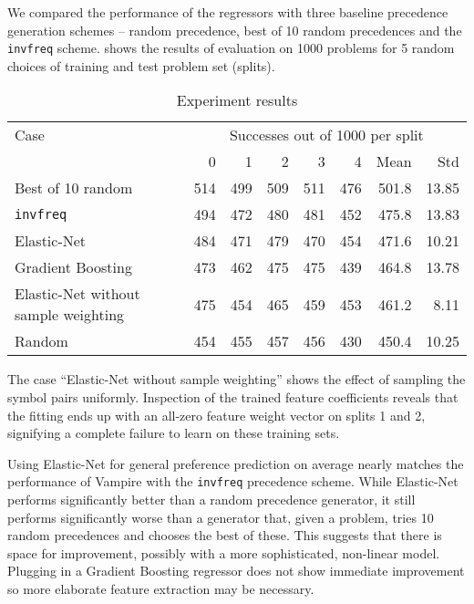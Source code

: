 \documentclass{ceurart}
\begin{document}
We compared the performance of the regressors
with three baseline precedence generation schemes -- random precedence, best of 10 random precedences
and the \texttt{invfreq} scheme.
 shows the results of evaluation on 1000 problems
for 5 random choices of training and test problem set (splits).


\begin{table*}
    \caption{Experiment results}
	\label{table:results}
	\begin{tabular}{l|rrrrr|rr}
	    \toprule
		Case & \multicolumn{7}{c}{Successes out of 1000 per split} \\
		& 0 & 1 & 2 & 3 & 4 & Mean & Std \\
		\midrule
		Best of 10 random & 514 & 499 & 509 & 511 & 476 & 501.8 & 13.85 \\
		\texttt{invfreq} & 494 & 472 & 480 & 481 & 452 & 475.8 & 13.83 \\
		Elastic-Net & 484 & 471 & 479 & 470 & 454 & 471.6 & 10.21 \\
		Gradient Boosting & 473 & 462 & 475 & 475 & 439 & 464.8 & 13.78 \\
		Elastic-Net without sample weighting & 475 & 454 & 465 & 459 & 453 & 461.2 & 8.11 \\
		Random & 454 & 455 & 457 & 456 & 430 & 450.4 & 10.25 \\
		\bottomrule
	\end{tabular}
\end{table*}

The case ``Elastic-Net without sample weighting'' shows the effect of
sampling the symbol pairs uniformly.
Inspection of the trained feature coefficients reveals that the fitting ends up
with an all-zero feature weight vector on splits 1 and 2,
signifying a complete failure to learn on these training sets.

Using Elastic-Net for general preference prediction on average nearly matches the performance
of Vampire with the \texttt{invfreq} precedence scheme.
While Elastic-Net performs significantly better than a random precedence generator,
it still performs significantly worse than a generator
that, given a problem, tries 10 random precedences and chooses the best of these.
This suggests that there is space for improvement, possibly with a more sophisticated, non-linear model.
Plugging in a Gradient Boosting regressor does not show immediate improvement
so more elaborate feature extraction may be necessary.
\end{document}
